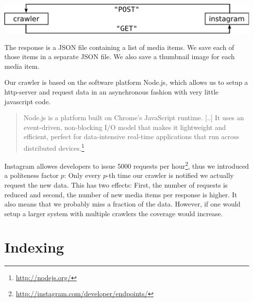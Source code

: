 \documentclass[11pt]{article}
\begin{document}
	\vspace{0.5cm}\includegraphics[width=\textwidth,keepaspectratio]{crawler.pdf}

	The response is a JSON file containing a list of media items. We save each of those items in a separate JSON file. We also save a thumbnail image for each media item.

	Our crawler is based on the software platform Node.js, which allows us to setup a http-server and request data in an asynchronous fashion with very little javascript code.
	\begin{quote}
		Node.js is a platform built on Chrome's JavaScript runtime. [..] It uses an event-driven, non-blocking I/O model that makes it lightweight and efficient, perfect for data-intensive real-time applications that run across distributed devices.\footnote{\url{http://nodejs.org/}}
	\end{quote}

	Instagram allowes developers to issue 5000 requests per hour\footnote{\url{http://instagram.com/developer/endpoints/}}, thus we introduced a politeness factor $p$: Only every $p$-th time our crawler is notified we actually request the new data. This has two effects: First, the number of requests is reduced and second, the number of new media items per response is higher. It also means that we probably miss a fraction of the data. However, if one would setup a larger system with multiple crawlers the coverage would increase.



\section{Indexing}
\end{document}
